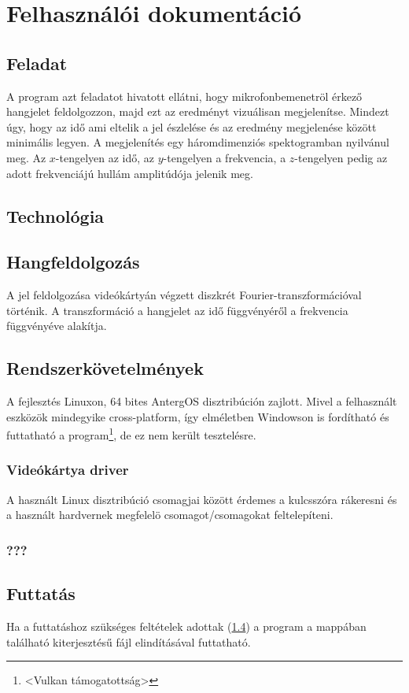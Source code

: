 
\section{Felhaszn\'al\'oi dokument\'aci\'o}
\subsection{Feladat}
A program azt feladatot hivatott ell\'atni, hogy mikrofonbemenetr\"ol \'erkez\H o hangjelet feldolgozzon, majd ezt az eredm\'enyt vizu\'alisan megjelen\'itse. Mindezt \'ugy, hogy az id\H o ami eltelik a jel \'eszlel\'ese \'es az eredm\'eny megjelen\'ese k\"oz\"ott minim\'alis legyen.
A megjelen\'it\'es egy h\'aromdimenzi\'os spektogramban nyilv\'anul meg. Az $x$-tengelyen az id\H o, az $y$-tengelyen a frekvencia, a $z$-tengelyen pedig az adott frekvenci\'aj\'u hull\'am amplit\'ud\'oja jelenik meg.

\subsection{Technol\'ogia}

\subsection{Hangfeldolgoz\'as}
A jel feldolgoz\'asa vide\'ok\'arty\'an v\'egzett diszkr\'et Fourier-transzform\'aci\'oval t\"ort\'enik. A transzform\'aci\'o a hangjelet az id\H o f\"uggv\'eny\'er\H ol a frekvencia f\"uggv\'eny\'eve alak\'itja. 

\subsection{Rendszerk\"ovetelm\'enyek}\label{runrequirements}
A fejleszt\'es Linuxon, 64 bites AntergOS disztrib\'uci\'on zajlott. Mivel a felhaszn\'alt eszk\"oz\"ok mindegyike cross-platform, \'igy elm\'eletben Windowson is ford\'ithat\'o \'es futtathat\'o a program\footnote{<Vulkan t\'amogatotts\'ag>}, de ez nem ker\"ult tesztel\'esre.

\subsubsection{Vide\'ok\'artya driver}
A haszn\'alt Linux disztrib\'uci\'o csomagjai k\"oz\"ott \'erdemes a  kulcssz\'ora r\'akeresni \'es a haszn\'alt hardvernek megfelel\"o csomagot/csomagokat feltelep\'iteni.

\subsubsection{???}


\subsection{Futtat\'as}
Ha a futtat\'ashoz sz\"uks\'eges felt\'etelek adottak (\ref{runrequirements}) a program a  mapp\'aban tal\'alhat\'o  kiterjeszt\'es\H u f\'ajl elind\'it\'as\'aval futtathat\'o. 
